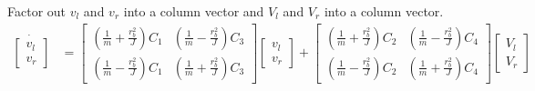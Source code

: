 Factor out $v_l$ and $v_r$ into a column vector and $V_l$ and $V_r$ into a
column vector.
\begin{align*}
  \dot{\begin{bmatrix}
    v_l \\
    v_r
  \end{bmatrix}} &=
  \begin{bmatrix}
    \left(\frac{1}{m} + \frac{r_b^2}{J}\right) C_1 &
    \left(\frac{1}{m} - \frac{r_b^2}{J}\right) C_3 \\
    \left(\frac{1}{m} - \frac{r_b^2}{J}\right) C_1 &
    \left(\frac{1}{m} + \frac{r_b^2}{J}\right) C_3
  \end{bmatrix}
  \begin{bmatrix}
    v_l \\
    v_r
  \end{bmatrix} +
  \begin{bmatrix}
    \left(\frac{1}{m} + \frac{r_b^2}{J}\right) C_2 &
    \left(\frac{1}{m} - \frac{r_b^2}{J}\right) C_4 \\
    \left(\frac{1}{m} - \frac{r_b^2}{J}\right) C_2 &
    \left(\frac{1}{m} + \frac{r_b^2}{J}\right) C_4
  \end{bmatrix}
  \begin{bmatrix}
    V_l \\
    V_r
  \end{bmatrix}
\end{align*}

